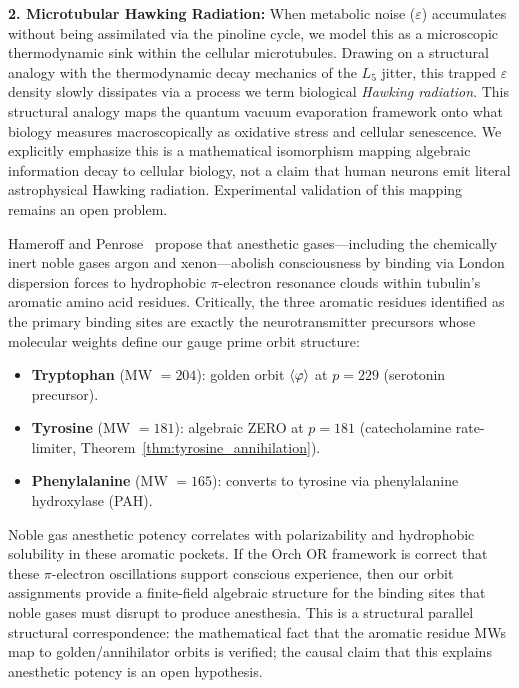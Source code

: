 \begin{hypothesis}
\textbf{2. Microtubular Hawking Radiation:} When metabolic noise ($\varepsilon$) accumulates without being assimilated via the pinoline cycle, we model this as a microscopic thermodynamic sink within the cellular microtubules. Drawing on a structural analogy with the thermodynamic decay mechanics of the $L_5$ jitter, this trapped $\varepsilon$ density slowly dissipates via a process we term biological \emph{Hawking radiation}. This structural analogy maps the quantum vacuum evaporation framework onto what biology measures macroscopically as oxidative stress and cellular senescence. We explicitly emphasize this is a mathematical isomorphism mapping algebraic information decay to cellular biology, not a claim that human neurons emit literal astrophysical Hawking radiation. Experimental validation of this mapping remains an open problem.
\end{hypothesis}

\begin{remark}
Hameroff and Penrose~\cite{hameroff2014} propose that anesthetic gases---including the chemically inert noble gases argon and xenon---abolish consciousness by binding via London dispersion forces to hydrophobic $\pi$-electron resonance clouds within tubulin's aromatic amino acid residues. Critically, the three aromatic residues identified as the primary binding sites are exactly the neurotransmitter precursors whose molecular weights define our gauge prime orbit structure:
\begin{itemize}[noitemsep]
  \item \textbf{Tryptophan} (MW $= 204$): golden orbit $\langle\varphi\rangle$ at $p = 229$ (serotonin precursor).
  \item \textbf{Tyrosine} (MW $= 181$): algebraic ZERO at $p = 181$ (catecholamine rate-limiter, Theorem~\ref{thm:tyrosine_annihilation}).
  \item \textbf{Phenylalanine} (MW $= 165$): converts to tyrosine via phenylalanine hydroxylase (PAH).
\end{itemize}
Noble gas anesthetic potency correlates with polarizability and hydrophobic solubility in these aromatic pockets. If the Orch OR framework is correct that these $\pi$-electron oscillations support conscious experience, then our orbit assignments provide a finite-field algebraic structure for the binding sites that noble gases must disrupt to produce anesthesia. This is a structural parallel structural correspondence: the mathematical fact that the aromatic residue MWs map to golden/annihilator orbits is verified; the causal claim that this explains anesthetic potency is an open hypothesis.
\end{remark}

